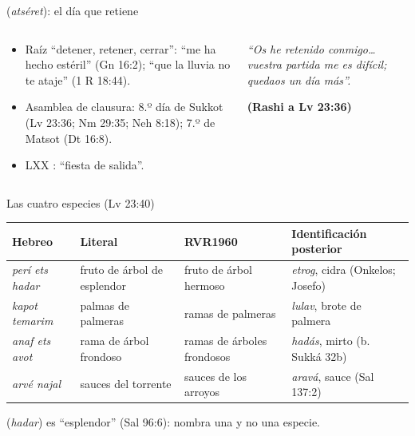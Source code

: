 \begin{frame}{ (\emph{atséret}): el día que retiene}
\begin{columns}[t,onlytextwidth]
\begin{column}{0.52\textwidth}\small
\begin{itemize}
\item Raíz  ``detener, retener, cerrar'': ``me ha hecho estéril'' (Gn 16:2); ``que la lluvia no te ataje'' (1 R 18:44).
\item Asamblea de clausura: 8.º día de Sukkot (Lv 23:36; Nm 29:35; Neh 8:18); 7.º de Matsot (Dt 16:8).
\item LXX : ``fiesta de salida''.
\end{itemize}
\end{column}
\begin{column}{0.46\textwidth}
\begin{tcolorbox}[colback=papiro,colframe=mostaza!80!tierraroja,boxrule=0.8pt,arc=3pt,left=4pt,right=4pt]
\scriptsize\itshape ``Os he retenido conmigo\ldots{} vuestra partida me es difícil; quedaos un día más''.\par\hfill\upshape\textbf{\textcolor{tierraroja}{(Rashi a Lv 23:36)}}
\end{tcolorbox}
\end{column}
\end{columns}
\end{frame}

\begin{frame}{Las cuatro especies (Lv 23:40)}
\scriptsize\renewcommand{\arraystretch}{1.2}
\begin{tabular}{@{}L{2.9cm}L{2.7cm}L{2.6cm}L{3.6cm}@{}}
\toprule
\textbf{Hebreo} & \textbf{Literal} & \textbf{RVR1960} & \textbf{Identificación posterior} \\ \midrule
{} \emph{perí ets hadar} & fruto de árbol de esplendor & fruto de árbol hermoso & \emph{etrog}, cidra (Onkelos; Josefo) \\
 \emph{kapot temarim} & palmas de palmeras & ramas de palmeras & \emph{lulav}, brote de palmera \\
 \emph{anaf ets avot} & rama de árbol frondoso & ramas de árboles frondosos & \emph{hadás}, mirto (b. Sukká 32b) \\
 \emph{arvé najal} & sauces del torrente & sauces de los arroyos & \emph{aravá}, sauce (Sal 137:2) \\
\bottomrule
\end{tabular}\par\medskip
\small {} (\emph{hadar}) es ``esplendor'' (Sal 96:6): nombra una  y no una especie.\par\smallskip
{}
\end{frame}


